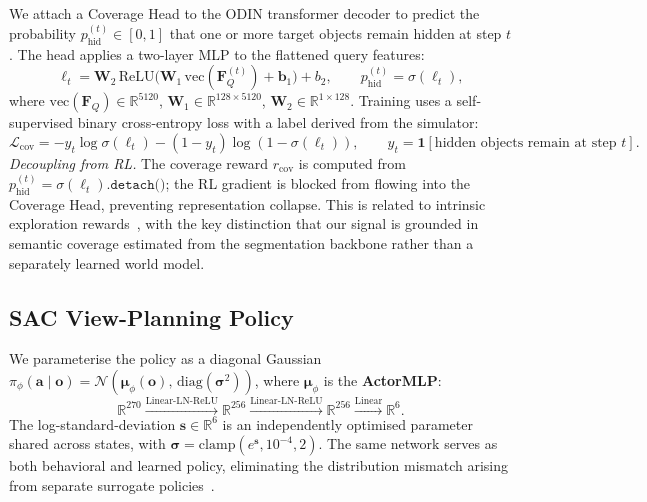 \documentclass{article}
\newcommand{\phid}{p_{\text{hid}}}
\begin{document}
We attach a Coverage Head to the ODIN transformer decoder to predict the probability $\phid^{(t)} \in [0,1]$ that one or more target objects remain hidden at step $t$. The head applies a two-layer MLP to the flattened query features:
\begin{equation}
  \ell_t = \mathbf{W}_2\,\mathrm{ReLU}\!\bigl(\mathbf{W}_1\,\mathrm{vec}(\mathbf{F}_Q^{(t)}) + \mathbf{b}_1\bigr) + b_2,
  \qquad \phid^{(t)} = \sigma(\ell_t),
  \label{eq:coverage_head}
\end{equation}
where $\mathrm{vec}(\mathbf{F}_Q)\in\mathbb{R}^{5120}$, $\mathbf{W}_1\in\mathbb{R}^{128\times 5120}$, $\mathbf{W}_2\in\mathbb{R}^{1\times 128}$. Training uses a self-supervised binary cross-entropy loss with a label derived from the simulator:
\begin{equation}
  \mathcal{L}_\text{cov} = -y_t\log\sigma(\ell_t) - (1 - y_t)\log(1 - \sigma(\ell_t)),
  \qquad y_t = \mathbf{1}[\text{hidden objects remain at step }t].
  \label{eq:bce}
\end{equation}
\emph{Decoupling from RL.} The coverage reward $r_\text{cov}$ is computed from $\phid^{(t)} = \sigma(\ell_t)\texttt{.detach()}$; the RL gradient is blocked from flowing into the Coverage Head, preventing representation collapse. This is related to intrinsic exploration rewards~\citep{shyam2019model,sekar2020planning}, with the key distinction that our signal is grounded in semantic coverage estimated from the segmentation backbone rather than a separately learned world model.

\subsection{SAC View-Planning Policy}
\label{sec:actor}

We parameterise the policy as a diagonal Gaussian $\pi_\phi(\mathbf{a} \mid \mathbf{o}) = \mathcal{N}(\bm{\mu}_\phi(\mathbf{o}),\,\mathrm{diag}(\bm{\sigma}^2))$, where $\bm{\mu}_\phi$ is the \textbf{ActorMLP}:
\[
  \mathbb{R}^{270} \xrightarrow{\text{Linear-LN-ReLU}} \mathbb{R}^{256} \xrightarrow{\text{Linear-LN-ReLU}} \mathbb{R}^{256} \xrightarrow{\text{Linear}} \mathbb{R}^{6}.
\]
The log-standard-deviation $\mathbf{s}\in\mathbb{R}^6$ is an independently optimised parameter shared across states, with $\bm{\sigma} = \mathrm{clamp}(e^{\mathbf{s}}, 10^{-4}, 2)$. The same network serves as both behavioral and learned policy, eliminating the distribution mismatch arising from separate surrogate policies~\citep{fujimoto2018td3}.
\end{document}
